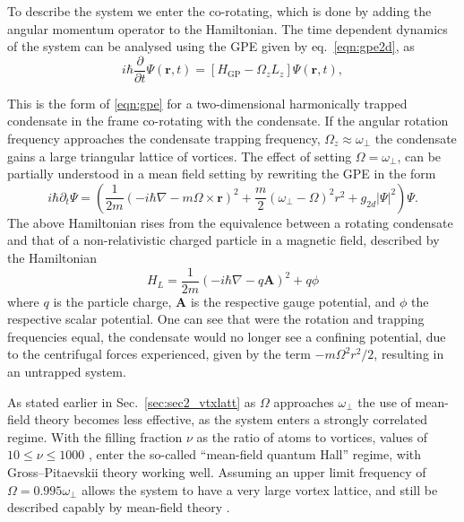 To describe the system we enter the co-rotating, which is done by adding the angular momentum operator to the Hamiltonian. The time dependent dynamics of the system can be analysed using the GPE given by eq.~\ref{eqn:gpe2d}, as
\begin{equation*}\label{eqn:gpe2d_}
	i\hbar\frac{\partial}{\partial t}\Psi(\mathbf{r},t) = \left[ H_{\text{GP}}  -  \Omega_z L_z \right] \Psi(\mathbf{r},t),
\end{equation*}

This is the form of \ref{eqn:gpe} for a two-dimensional harmonically trapped condensate in the frame co-rotating with the condensate. If the angular rotation frequency approaches the condensate trapping frequency, $\Omega_z \approx \omega_\perp$ the condensate gains a large triangular lattice of vortices.  The effect of setting $\Omega=\omega_\perp$, can be partially understood in a mean field setting by rewriting the GPE in the form
\begin{equation}
    i\hbar\partial_t \Psi =
    \left(\frac{1}{2m}(-i\hbar\nabla - m\Omega\times\mathbf{r})^2 + \frac{m}{2}(\omega_\perp - \Omega)^2{r}^2 + g_{2d}|\Psi|^2 \right)\Psi.
\end{equation}
The above Hamiltonian rises from the equivalence between a rotating condensate and that of a non-relativistic charged particle in a magnetic field, described by the Hamiltonian
\begin{equation}
     H_L = \frac{1}{2m}\left(-i\hbar \nabla  - q\mathbf{A}\right)^2 + q\phi
\end{equation}
where $q$ is the particle charge, $\mathbf{A}$ is the respective gauge potential, and $\phi$ the respective scalar potential. One can see that were the rotation and trapping frequencies equal, the condensate would no longer see a confining potential, due to the centrifugal forces experienced, given by the term $-m\Omega^2r^2/2$, resulting in an untrapped system.

As stated earlier in Sec.~\ref{sec:sec2_vtxlatt} as $\Omega$ approaches $\omega_\perp$ the use of mean-field theory becomes less effective, as the system enters a strongly correlated regime. With the filling fraction $\nu$ as the ratio of atoms to vortices, values of $10 \leq \nu \leq 1000$ , enter the so-called ``mean-field quantum Hall'' regime, with Gross--Pitaevskii theory working well. Assuming an upper limit frequency of $\Omega = 0.995\omega_\perp$ allows the system to have a very large vortex lattice, and still be described capably by mean-field theory \cite{Vtx:Fetter_rmp_2009}.

